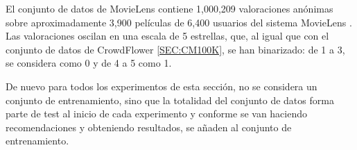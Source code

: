 El conjunto de datos de MovieLens \cite{movieLens} contiene 1,000,209 valoraciones anónimas sobre aproximadamente 3,900 películas de 6,400 usuarios del sistema MovieLens \cite{webMovieLens}. Las valoraciones oscilan en una escala de 5 estrellas, que, al igual que con el conjunto de datos de CrowdFlower \ref{SEC:CM100K}, se han binarizado: de 1 a 3, se considera como 0 y de 4 a 5 como 1. 

De nuevo para todos los experimentos de esta sección, no se considera un conjunto de entrenamiento, sino que la totalidad del conjunto de datos forma parte de test al inicio de cada experimento y conforme se van haciendo recomendaciones y obteniendo resultados, se añaden al conjunto de entrenamiento.
